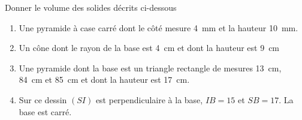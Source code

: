 
\begin{exercice}\label{exo2smath-0188}

    Donner le volume des solides décrits ci-dessous
    \begin{enumerate}
        \item
            Une pyramide à case carré dont le côté mesure \SI{4}{\milli\meter} et la hauteur \SI{10}{\milli\meter}.
        \item
            Un cône dont le rayon de la base est \SI{4}{\centi\meter} et dont la hauteur est \SI{9}{\centi\meter}
        \item
            Une pyramide dont la base est un triangle rectangle de mesures \SI{13}{\centi\meter}, \SI{84}{\centi\meter} et \SI{85}{\centi\meter} et dont la hauteur est \SI{17}{\centi\meter}.
        \item
            \begin{multicols}{2}
            Sur ce dessin \( (SI)\) est perpendiculaire à la base, \( IB=15\) et \( SB=17\). La base est carré.
            \columnbreak
\begin{center}                                                                                     
                                                    
\end{center}
            \end{multicols}
    \end{enumerate}

\end{exercice}
